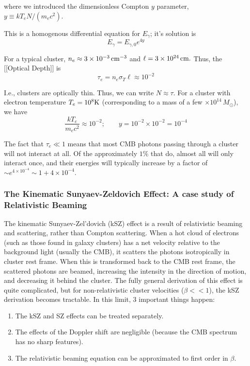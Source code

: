 \documentclass{article}
\begin{document}
 where we introduced the dimensionless Compton $y$ parameter, $y\equiv kT_{e}N/\left(m_{e}c^{2}\right)$.

This is a homogenous differential equation for $E_{\gamma}$; it's solution is $$E_{\gamma}=E_{\gamma,0}e^{4y}$$

For a typical cluster, $n_{e}\approx3\times10^{-3}\,{\rm cm}^{-3}$ and $\ell=3\times10^{24}\,{\rm cm}.$ Thus, the [[Optical Depth]] is $$\tau_{e}=n_{e}\sigma_{T}\ell\approx10^{-2}$$

 I.e., clusters are optically thin. Thus, we can write $N\approx\tau$. For a cluster with electron temperature $T_{e}=10^{8}{\rm K}$ (corresponding to a mass of a few $\times10^{14}\,M_{\odot}$), we have $$\frac{kT_{e}}{m_{e}c^{2}}\approx10^{-2};\qquad y=10^{-2}\times10^{-2}=10^{-4}$$

The fact that $\tau_{e}\ll1$ means that most CMB photons passing through a cluster will not interact at all. Of the approximately $1\%$ that do, almost all will only interact once, and their energies will typically increase by a factor of $\sim e^{4\times10^{-4}}\sim1+4\times10^{-4}$.


\subsubsection{The Kinematic Sunyaev-Zeldovich Effect: A case study of Relativistic Beaming
}

The kinematic Sunyaev-Zel'dovich (kSZ) effect is a result of relativistic beaming and scattering, rather than Compton scattering.  When a hot cloud of electrons (such as those found in galaxy clusters) has a net velocity relative to the background light (usually the CMB), it scatters the photons isotropically in cluster rest frame.  When this is transformed back to the CMB rest frame, the scattered photons are beamed, increasing the intensity in the direction of motion, and decreasing it behind the cluster.  The fully general derivation of this effect is quite complicated, but for non-relativistic cluster velocities ($\beta << 1$), the kSZ derivation becomes tractable.  In this limit, 3 important things happen:
\begin{enumerate}
  \item The kSZ and SZ effects can be treated separately.
  \item The effects of the Doppler shift are negligible (because the CMB spectrum has no sharp features).
  \item The relativistic beaming equation can be approximated to first order in $\beta$.
\end{enumerate}
\end{document}
